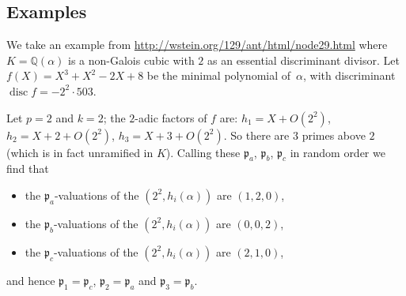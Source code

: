 \documentclass{article}
\def\Q{{\mathbb Q}}
\def\p{{\mathfrak p}}
\def\Qpbar{\overline{\Q_p}}
\DeclareMathOperator{\disc}{disc}
\DeclareMathOperator{\ord}{ord}
\begin{document}
%
%
%

\subsection{Examples}
We take an example from
\url{http://wstein.org/129/ant/html/node29.html} where $K=\Q(\alpha)$ is a
non-Galois cubic with $2$ as an essential discriminant divisor.  Let
$f(X) = X^3+X^2-2X+8$ be the minimal polynomial of~$\alpha$, with discriminant
$\disc f = -2^2\cdot503$.

Let $p=2$ and $k=2$; the $2$-adic factors of $f$ are: $h_1=X+O(2^2)$,
$h_2=X+2+O(2^2)$, $h_3=X+3+O(2^2)$.  So there are $3$
primes above $2$ (which is in fact unramified in $K$).  Calling these
$\p_a$, $\p_b$, $\p_c$ in random order we find that
\begin{itemize}
  \item the $\p_a$-valuations of the $(2^2,h_i(\alpha))$ are $(1,2,0)$,
  \item the $\p_b$-valuations of the $(2^2,h_i(\alpha))$ are $(0,0,2)$,
  \item the $\p_c$-valuations of the $(2^2,h_i(\alpha))$ are $(2,1,0)$,
\end{itemize}
and hence $\p_1=\p_c$, $\p_2=\p_a$ and $\p_3=\p_b$.
\end{document}
